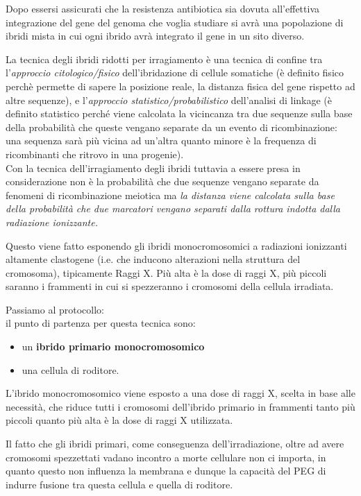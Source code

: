\documentclass[11pt]{book}
\begin{document}
Dopo essersi assicurati che la resistenza antibiotica sia dovuta all'effettiva integrazione del gene del genoma che voglia studiare si avrà una popolazione di ibridi mista in cui ogni ibrido avrà integrato il gene in un sito diverso. 

La tecnica degli ibridi ridotti per irragiamento è una tecnica di confine tra l'\emph{approccio citologico/fisico} dell'ibridazione di cellule somatiche (è definito fisico perchè permette di sapere la posizione reale, la distanza fisica del gene rispetto ad altre sequenze), e l'\emph{approccio statistico/probabilistico} dell'analisi di linkage (è definito statistico perché viene calcolata la vicincanza tra due sequenze sulla base della probabilità che queste vengano separate da un evento di ricombinazione: una sequenza sarà più vicina ad un’altra quanto minore è la frequenza di ricombinanti che ritrovo in una progenie).\\
Con la tecnica dell'irragiamento degli ibridi tuttavia a essere presa in considerazione non è la probabilità che due sequenze vengano separate da fenomeni di ricombinazione meiotica ma \emph{la distanza viene calcolata sulla base della probabilità che due marcatori vengano separati dalla rottura indotta dalla radiazione ionizzante.}

Questo viene fatto esponendo gli ibridi monocromosomici a radiazioni ionizzanti altamente clastogene (i.e. che inducono alterazioni nella struttura del cromosoma), tipicamente Raggi X. Più alta è la dose di raggi X, più piccoli saranno i frammenti in cui si spezzeranno i cromosomi della cellula irradiata.

Passiamo al protocollo:\\ 
il punto di partenza per questa tecnica sono:
\begin{itemize}
\item un \textbf{ibrido primario monocromosomico}
\item una cellula di roditore.
\end{itemize}

L’ibrido monocromosomico viene esposto a una dose di raggi X, scelta in base alle necessità, che riduce tutti i cromosomi dell’ibrido primario in frammenti tanto più piccoli quanto più alta è la dose di raggi X utilizzata.

Il fatto che gli ibridi primari, come conseguenza dell'irradiazione, oltre ad avere cromosomi spezzettati vadano incontro a morte cellulare non ci importa, in quanto questo non influenza la membrana e dunque la capacità del PEG di indurre fusione tra questa cellula e quella di roditore.
\end{document}
